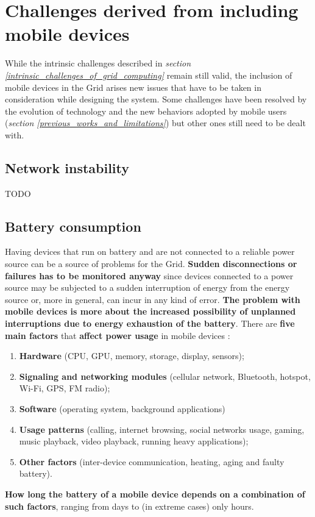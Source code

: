 \section{Challenges derived from including mobile devices}\label{challenges_derived_from_mobile_devides}
While the intrinsic challenges described in \textit{section \ref{intrinsic_challenges_of_grid_computing}} remain still valid, the inclusion of mobile devices in the Grid arises new issues that have to be taken in consideration while designing the system. Some challenges have been resolved by the evolution of technology and the new behaviors adopted by mobile users (\textit{section \ref{previous_works_and_limitations}}) but other ones still need to be dealt with.

\subsection{Network instability}
TODO

\subsection{Battery consumption}
Having devices that run on battery and are not connected to a reliable power source can be a source of problems for the Grid. \textbf{Sudden disconnections or failures has to be monitored anyway} since devices connected to a power source may be subjected to a sudden interruption of energy from the energy source or, more in general, can incur in any kind of error. \textbf{The problem with mobile devices is more about the increased possibility of unplanned interruptions due to energy exhaustion of the battery}.
There are \textbf{five main factors} that \textbf{affect power usage} in mobile devices \cite{mobile_power_consumption}:
\begin{enumerate}
    \item \textbf{Hardware} (CPU, GPU, memory, storage, display, sensors);
    \item \textbf{Signaling and networking modules} (cellular network, Bluetooth, hotspot, Wi-Fi, GPS, FM radio);
    \item \textbf{Software} (operating system, background applications)
    \item \textbf{Usage patterns} (calling, internet browsing, social networks usage, gaming, music playback, video playback, running heavy applications);
    \item \textbf{Other factors} (inter-device communication, heating, aging and faulty battery).
\end{enumerate}
\textbf{How long the battery of a mobile device depends on a combination of such factors}, ranging from days to (in extreme cases) only hours.

